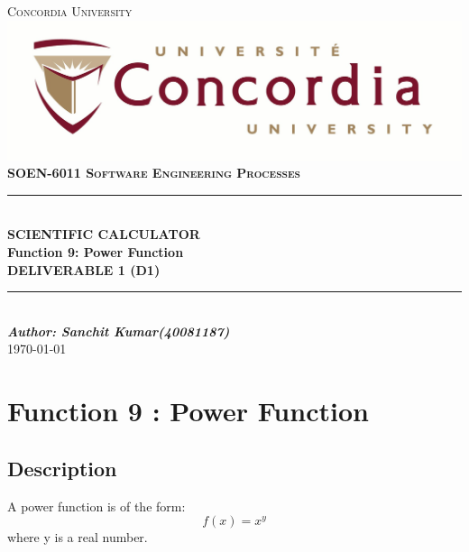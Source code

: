 \documentclass[a4paper,12pt]{article}
\newcommand{\Author}{Sanchit Kumar(40081187)}
\newcommand{\ProjectName}{Function 9: Power Function}
\newcommand{\Course}{\textbf{SOEN-6011 \vspace{0.5cm} Software Engineering Processes}}
\begin{document}

\begin{titlepage}
\newcommand{\HRule}{\rule{\linewidth}{0.5mm}} %


\centering
\textsc{\LARGE Concordia University} \\ [5mm] 
\includegraphics[scale=.1]{University_logo.jpg}\\[1cm] 
\textsc{\Large \Course} \\ [0.5cm]

	
\HRule \\[0.4cm]
{ \huge \bfseries SCIENTIFIC CALCULATOR \\ [5mm]  \ProjectName}\\[0.4cm] 
{\large \textbf{DELIVERABLE 1 (D1)} }	
\HRule \\[1.5cm]


\vspace{5cm}
\Large \emph{\textbf{Author: \Author}}\\
{\large \today}\\[2cm]

\vfill
\end{titlepage}	





\newpage

\section{\large Function 9 : Power Function}

\subsection{Description}
A power function is of the form:
\begin{equation} \label{Power_func}
f(x) = x^y
\end{equation}
where y is a real number.
\end{document}
